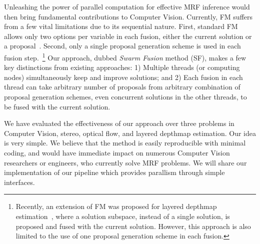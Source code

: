 Unleashing the power of parallel computation for effective MRF inference
would then bring fundamental contributions to Computer
Vision. Currently, FM suffers from a few vital limitations due to its
sequential nature. First, standard FM allows only two options per
variable in each fusion, either the current solution or a
proposal~\cite{fusion_moves_for_markov_random_field_optimization}. Second,
only a single proposal generation scheme is used in each fusion
step.~\footnote{Recently, an extension of FM was proposed for layered
depthmap estimation~\cite{layered_depthmap}, where a solution subspace, instead
of a single solution, is proposed and fused with the current
solution. However, this approach is also limited to the use of one proposal
generation scheme in each fusion.}
%
Our approach, dubbed {\it Swarm Fusion} method (SF), makes a
few key distinctions from existing approaches: 1) Multiple threads (or
computing nodes) simultaneously keep and improve solutions; and 2) Each
fusion in each thread can take arbitrary number of proposals from
arbitrary combination of proposal generation schemes, even concurrent
solutions in the other threads, to be fused with the current solution.
%


We have evaluated the effectiveness of our approach over three problems
in Computer Vision, stereo, optical flow, and layered
depthmap estimation.
%
Our idea is very simple. We believe that the method is easily
reproducible with minimal coding, and would have immediate impact on
numerous Computer Vision researchers or engineers, who currently solve
MRF problems. We will share our implementation of our pipeline which provides
parallism through simple interfaces.


%
%


%


